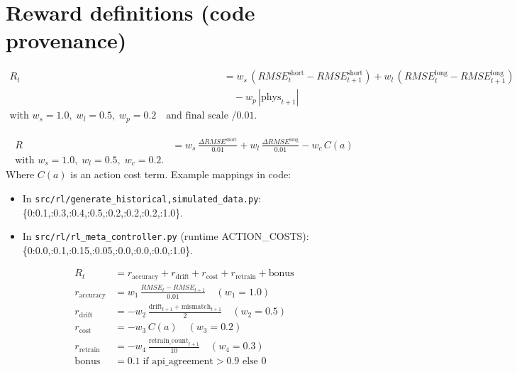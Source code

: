 \section*{Reward definitions (code provenance)}

\begin{align*}
R_t &= w_{s}\,(RMSE^{\text{short}}_{t} - RMSE^{\text{short}}_{t+1}) 
      + w_{l}\,(RMSE^{\text{long}}_{t} - RMSE^{\text{long}}_{t+1}) \\
    &\quad - w_{p}\,|\mathrm{phys}_{t+1}|\\
    \text{with } w_{s}=1.0,\; w_{l}=0.5,\; w_{p}=0.2\quad\text{and final scale }/0.01.
\end{align*}

\begin{align*}
R &= w_{s}\,\frac{\Delta RMSE^{\text{short}}}{0.01} + w_{l}\,\frac{\Delta RMSE^{\text{long}}}{0.01} - w_{c}\,C(a)\\
\text{with } w_{s}=1.0,\; w_{l}=0.5,\; w_{c}=0.2.
\end{align*}
Where $C(a)$ is an action cost term. Example mappings in code:
\begin{itemize}
  \item In \texttt{src/rl/generate_{historical,simulated}_data.py}: 
    \{0:0.1,:0.3,:0.4,:0.5,:0.2,:0.2,:0.2,:1.0\}.
  \item In \texttt{src/rl/rl_meta_controller.py} (runtime ACTION_COSTS):
    \{0:0.0,:0.1,:0.15,:0.05,:0.0,:0.0,:0.0,:1.0\}.
\end{itemize}

\begin{align*}
R_t &= r_{\mathrm{accuracy}} + r_{\mathrm{drift}} + r_{\mathrm{cost}} + r_{\mathrm{retrain}} + \mathrm{bonus} \\
r_{\mathrm{accuracy}} &= w_1\,\frac{RMSE_{t} - RMSE_{t+1}}{0.01} \quad (w_1=1.0)\\
r_{\mathrm{drift}} &= -w_2\,\frac{\mathrm{drift}_{t+1} + \mathrm{mismatch}_{t+1}}{2} \quad (w_2=0.5)\\
r_{\mathrm{cost}} &= -w_3\,C(a) \quad (w_3=0.2)\\
r_{\mathrm{retrain}} &= -w_4\,\frac{\mathrm{retrain\_count}_{t+1}}{10} \quad (w_4=0.3)\\
\mathrm{bonus} &= 0.1\;\text{if }\mathrm{api\_agreement}>0.9\text{ else }0
\end{align*}



